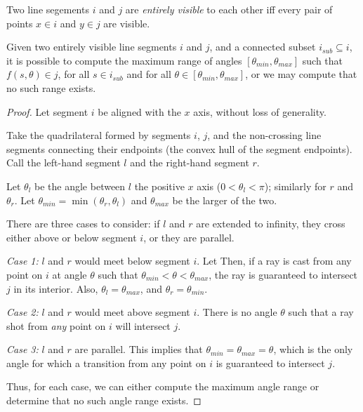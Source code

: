 \documentclass[]{styles/svproc}  %
\begin{document}
\begin{definition}
Two line segements $i$ and $j$ are \emph{entirely visible} to each other iff
every pair of points $x \in i$ and $y \in j$ are visible.
\end{definition}

\begin{proposition}
Given two entirely visible line segments $i$ and $j$, and a connected subset
$i_{sub} \subseteq i$, it is possible to compute the maximum range of angles 
$[\theta_{min}, \theta_{max}]$ such that $f(s, \theta) \in j$, for all $s \in
i_{sub}$ and for all $\theta \in [\theta_{min}, \theta_{max}]$, or we may
compute that no such range exists.
\end{proposition}

\begin{proof}
Let segment $i$ be aligned with the $x$ axis, without loss of generality.

Take the quadrilateral formed by segments $i$, $j$, and the non-crossing line
segments connecting their endpoints (the convex hull of the segment endpoints).
Call the left-hand segment $l$ and the right-hand segment $r$.

Let $\theta_{l}$ be
the angle between $l$ the positive $x$ axis ($0 < \theta_l < \pi$); similarly
for $r$ and $\theta_r$. Let $\theta_{min} = \min(\theta_r, \theta_l)$ and
$\theta_{max}$ be the larger of the two.

There are three cases to consider: if $l$ and $r$ are extended to infinity,
they cross either above or below segment $i$, or they are parallel.

\emph{Case 1:} $l$ and $r$ would meet below segment $i$. Let 
Then, if a ray is cast from any point on $i$ at angle $\theta$ such that $\theta_{min} <
\theta < \theta_{max}$, the ray is guaranteed to intersect $j$ in its interior.
Also, $\theta_l = \theta_{max}$, and $\theta_r = \theta_{min}$.

\emph{Case 2:} $l$ and $r$ would meet above segment $i$. There is no angle
$\theta$ such that a ray shot from \emph{any} point on $i$ will intersect $j$.

\emph{Case 3:} $l$ and $r$ are parallel. This implies that $\theta_{min} =
\theta_{max} = \theta$, which is the only angle for which a transition from any
point on $i$ is guaranteed to intersect $j$.

Thus, for each case, we can either compute the maximum angle range or determine
that no such angle range exists.
\end{proof}
\end{document}
